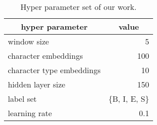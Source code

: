 \documentclass[11pt,letterpaper]{article}
\begin{document}
\begin{table}[t]
 \begin{center}                                                                                                                                                                                                                                                                                                             
\caption{Hyper parameter set of our work.}                                                                                                                                                                                                                                                                                  
\label{parameter}                                                                                                                                                                                                                                                                                                           
 \begin{tabular}{p{50mm}| r }
  \toprule
    \multicolumn{1}{c|}{hyper parameter} & \multicolumn{1}{c}{value} \\
    \midrule                                                                                                                                             
    window size & 5 \\                                                                                                                                        
    character embeddings &  100\\                                                                                                                           
    character type embeddings  &  10\\                                                                                                                          
    hidden layer size &  150\\                                                                                                                                     
    label set& \{B, I, E, S\} \\                                                                                                                                      
    learning rate  &0.1\\                                                                                                                                           

\end{tabular}
\end{center}
\end{table}
\end{document}
